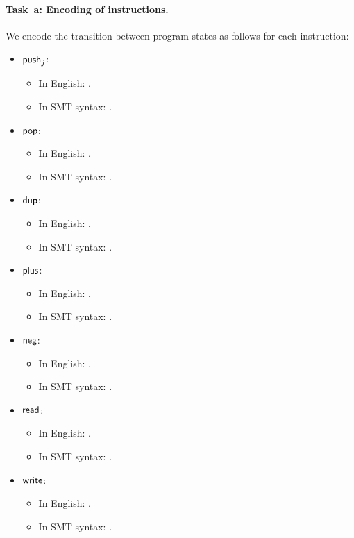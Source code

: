 \paragraph{Task~a: Encoding of instructions.}
We encode the transition between program states as follows for each
\SASM instruction:
\begin{itemize}
\item $\mathsf{push}_{j}$:
  \begin{itemize}
  \item In English: \todo{\filler}.
  \item In SMT syntax: \todo{\filler}.
  \end{itemize}
\item $\mathsf{pop}$:
  \begin{itemize}
  \item In English: \todo{\filler}.
  \item In SMT syntax: \todo{\filler}.
  \end{itemize}
\item $\mathsf{dup}$:
  \begin{itemize}
  \item In English: \todo{\filler}.
  \item In SMT syntax: \todo{\filler}.
  \end{itemize}
\item $\mathsf{plus}$:
  \begin{itemize}
  \item In English: \todo{\filler}.
  \item In SMT syntax: \todo{\filler}.
  \end{itemize}
\item $\mathsf{neg}$:
  \begin{itemize}
  \item In English: \todo{\filler}.
  \item In SMT syntax: \todo{\filler}.
  \end{itemize}
\item $\mathsf{read}$:
  \begin{itemize}
  \item In English: \todo{\filler}.
  \item In SMT syntax: \todo{\filler}.
  \end{itemize}
\item $\mathsf{write}$:
  \begin{itemize}
  \item In English: \todo{\filler}.
  \item In SMT syntax: \todo{\filler}.
  \end{itemize}
\end{itemize}

